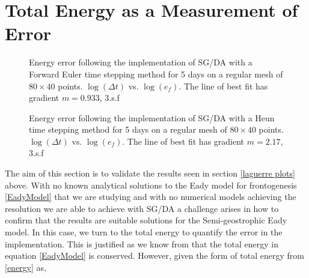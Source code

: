 \section{Total Energy as a Measurement of Error \label{energyerror}}
\begin{figure}[h]
	\centering
	\caption[Energy Error from implementation of SG/DA via Forward Euler timestepping method for 5 days]{Energy error following the implementation of SG/DA with a Forward Euler time stepping method for 5 days on a regular mesh of $80 \times 40$ points. $\log(\Delta t)$ vs. $\log(e_f)$. The line of best fit has gradient $m = 0.933$, 3.s.f} \label{fig:energy5deuler}
\end{figure}
\begin{figure}
	\caption[Energy Error from implementation of SG/DA via Heun timestepping method for 5 days]{ Energy error following the implementation of SG/DA with a Heun time stepping method for 5 days on a regular mesh of $80 \times 40$ points. $\log(\Delta t)$ vs. $\log(e_f)$. The line of best fit has gradient $m = 2.17$, 3.s.f}
	\label{fig:energy5dheun}
\end{figure}
The aim of this section is to validate the results seen in section \ref{laguerre plots} above. With no known analytical solutions to the Eady model for frontogenesis \ref{EadyModel} that we are studying and with no numerical models achieving the resolution we are able to achieve with SG/DA a challenge arises in how to confirm that the results are suitable solutions for the Semi-geostrophic Eady model. In this case, we turn to the total energy to quantify the error in the implementation. This is justified as we know from \cite{Cullen2006a} that the total energy in equation \ref{EadyModel} is conserved. However, given the form of total energy from \ref{energy} as,

